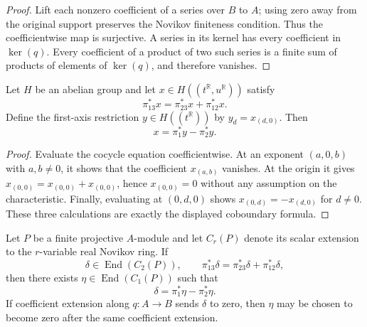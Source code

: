 \begin{proof}
  \leanok
  Lift each nonzero coefficient of a series over $B$ to $A$; using zero away
  from the original support preserves the Novikov finiteness condition.  Thus
  the coefficientwise map is surjective.  A series in its kernel has every
  coefficient in $\ker(q)$.  Every coefficient of a product of two such
  series is a finite sum of products of elements of $\ker(q)$, and therefore
  vanishes.
\end{proof}

\begin{lemma}
  \label{lem:additive_novikov_cech_coboundary}
  \leanok
  Let $H$ be an abelian group and let
  $x\in H((t^{\mathbb{R}},u^{\mathbb{R}}))$ satisfy
  \[
    \pi_{13}^\ast x=\pi_{23}^\ast x+\pi_{12}^\ast x.
  \]
  Define the first-axis restriction $y\in H((t^{\mathbb{R}}))$ by
  $y_d=x_{(d,0)}$.  Then
  \[
    x=\pi_1^\ast y-\pi_2^\ast y.
  \]
\end{lemma}

\begin{proof}
  \leanok
  Evaluate the cocycle equation coefficientwise.  At an exponent $(a,0,b)$
  with $a,b\neq0$, it shows that the coefficient $x_{(a,b)}$ vanishes.  At
  the origin it gives $x_{(0,0)}=x_{(0,0)}+x_{(0,0)}$, hence
  $x_{(0,0)}=0$ without any assumption on the characteristic.  Finally,
  evaluating at $(0,d,0)$ shows
  $x_{(0,d)}=-x_{(d,0)}$ for $d\neq0$.  These three calculations are exactly
  the displayed coboundary formula.
\end{proof}

\begin{lemma}
  \label{lem:endomorphism_novikov_cech_coboundary}
  \leanok
  Let $P$ be a finite projective $A$-module and let $C_r(P)$ denote its scalar
  extension to the $r$-variable real Novikov ring.  If
  \[
    \delta\in\operatorname{End}(C_2(P)),\qquad
    \pi_{13}^\ast\delta=\pi_{23}^\ast\delta+\pi_{12}^\ast\delta,
  \]
  then there exists $\eta\in\operatorname{End}(C_1(P))$ such that
  \[
    \delta=\pi_1^\ast\eta-\pi_2^\ast\eta.
  \]
  If coefficient extension along $q\colon A\to B$ sends $\delta$ to zero,
  then $\eta$ may be chosen to become zero after the same coefficient
  extension.
\end{lemma}

